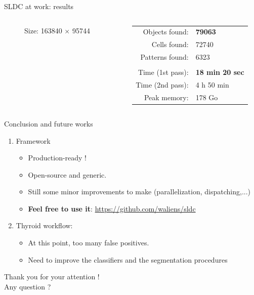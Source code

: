 \documentclass{beamer}
\begin{document}
\begin{frame}{SLDC at work: results}
\begin{columns}
\begin{column}{0.40\linewidth}
\begin{figure}
				\caption{Size: 163840 $\times$ 95744}
			\end{figure}
		\end{column}
		\begin{column}{0.47\linewidth}
		\begin{tabular}{rl}
				Objects found: & \textbf{79063} \\
				Cells found: & 72740 \\
				Patterns found: & 6323 \\
				& \\
				Time (1st pass): & \textbf{18 min 20 sec} \\
				Time (2nd pass): & 4 h 50 min  \\
				Peak memory: & 178 Go \\
			\end{tabular}
		\end{column}
	\end{columns}
	
\end{frame}


\begin{frame}{Conclusion and future works}

	\begin{enumerate}
		\item Framework

		\begin{itemize}
			\item Production-ready !
			\item Open-source and generic.
			\item Still some minor improvements to make (parallelization, dispatching,...)
			\item \textbf{Feel free to use it}: {\small\url{https://github.com/waliens/sldc}}
		\end{itemize}
		
		\item Thyroid workflow:
		
		\begin{itemize}
			\item At this point, too many false positives.
			\item Need to improve the classifiers and the segmentation procedures
		\end{itemize}			
	\end{enumerate}

\end{frame}


\begin{frame}
	\vfill
	\begin{center}
		Thank you for your attention ! \\
		Any question ?
	\end{center}
	\vfill
\end{frame}
\end{document}
